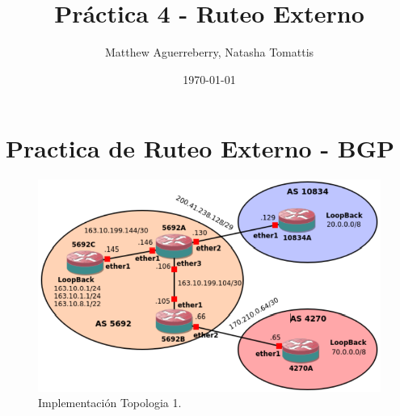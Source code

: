 \documentclass[letterpaper,12pt]{article}
\begin{document}
\title{Práctica 4 - Ruteo Externo}
\author{Matthew Aguerreberry, Natasha Tomattis}
\date{\today}
\maketitle

\section{Practica de Ruteo Externo - BGP}
	\begin{figure}[ht]
			
		\centering \includegraphics[width=0.6\columnwidth]{figure/bgp-topo.png}
		\caption{
				\label{fig:samplesetup} %
				Implementación Topologia 1.
		}
	\end{figure}
\end{document}
